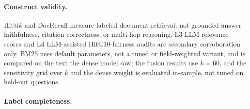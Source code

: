 \documentclass{ieeeaccess}
\makeatletter
\DeclareRobustCommand{\_}{\ifmmode\nfss@text{\textunderscore}\else\textunderscore\allowbreak\fi}
\makeatother
\begin{document}
\paragraph{Construct validity.}
Hit@$k$ and DocRecall measure labeled document retrieval, not grounded answer faithfulness, citation correctness, or multi-hop reasoning. L3 LLM relevance scores and L4 LLM-assisted Hit@10-fairness audits are secondary corroboration only. BM25 uses default parameters, not a tuned or field-weighted variant, and is compared on the text the dense model saw; the fusion results use $k{=}60$, and the sensitivity grid over $k$ and the dense weight is evaluated in-sample, not tuned on held-out questions.

\paragraph{Label completeness.}
\end{document}
